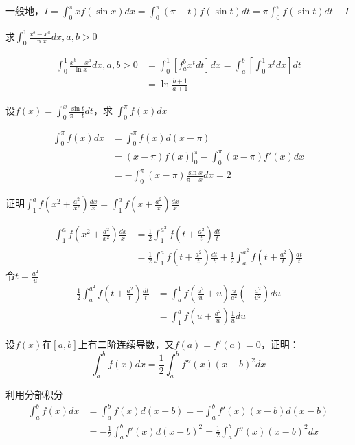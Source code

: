 \documentclass{article}
\begin{document}
\begin{remark}
一般地，\(I=\int^\pi_0xf(\sin x)dx=\int^\pi_0(\pi-t)f(\sin
   t)dt=\pi\int^\pi_0f(\sin t)dt-I\)
\end{remark}

\begin{examplle}[]
求\(\int_0^1\frac{x^b-x^a}{\ln x}dx,a,b>0\)

\begin{align*}
\int_0^1\frac{x^b-x^a}{\ln x}dx,a,b>0&=
\int^1_0\left[f^b_ax^tdt
\right]dx=\int^b_a\left[\int^1_0x^tdx
\right]dt\\
&=\ln\frac{b+1}{a+1}
\end{align*}
\end{examplle}

\begin{examplle}[]
设\(\displaystyle f(x)=\int_0^x\frac{\sin t}{\pi-t}dt\)，求
\(\int_0^\pi f(x)dx\)

\begin{align*}
\int^\pi_0f(x)dx&=\int_0^\pi f(x)d(x-\pi)\\
&=(x-\pi)f(x)|^\pi_0-\int_0^\pi(x-\pi)f'(x)dx\\
&=-\int_0^\pi (x-\pi)\frac{\sin x}{\pi-x}dx=2
\end{align*}
\end{examplle}

\begin{examplle}[]
证明\(\displaystyle\int_1^af(x^2+\frac{a^2}{x^2})\frac{dx}{x}=
   \int_1^af(x+\frac{a^2}{x})\frac{dx}{x}\)

\begin{align*}
\int_1^af(x^2+\frac{a^2}{x^2})\frac{dx}{x}&=\frac{1}{2}\int_1^{a^2}f(t+\frac{a^2}{t})\frac{dt}{t}\\
&=\frac{1}{2}\int_1^{a}f(t+\frac{a^2}{t})\frac{dt}{t}+
\frac{1}{2}\int_a^{a^2}f(t+\frac{a^2}{t})\frac{dt}{t}
\end{align*}
令\(t=\frac{a^2}{u}\)
\begin{align*}
\frac{1}{2}\int_a^{a^2}f(t+\frac{a^2}{t})\frac{dt}{t}&=
\int^1_af(\frac{a^2}{u}+u)\frac{u}{a^2}\left(-\frac{a^2}{u^2}\right)du\\
&=\int_1^af(u+\frac{a^2}{u})\frac{1}{u}du
\end{align*}
\end{examplle}

\begin{examplle}[]
设\(f(x)\)在\([a,b]\)上有二阶连续导数，又\(f(a)=f'(a)=0\)，证明：
\begin{equation*}
\int_a^bf(x)dx=\frac{1}{2}\int_a^bf''(x)(x-b)^2dx
\end{equation*}

利用分部积分
\begin{align*}
\int_a^bf(x)dx&=\int_a^b f(x)d(x-b)=-\int_a^bf'(x)(x-b)d(x-b)\\
&=-\frac{1}{2}\int_a^bf'(x)d(x-b)^2=\frac{1}{2}\int_a^bf''(x)(x-b)^2dx
\end{align*}
\end{examplle}
\end{document}
